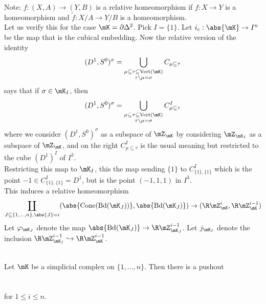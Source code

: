 \documentclass[a4paper]{article}
\begin{document}
Note: $f:(X,A)\to(Y,B)$ is a relative homeomorphism if $f:X\to Y$ is a homeomorphism and $\widetilde{f}:X/A\to Y/B$ is a homeomorphism. \\

Let us verify this for the case $\mK=\partial\Delta^2$. Pick $I=\{1\}$. Let $i_c:\abs{\mK}\to I^n$ be the map that is the cubical embedding. Now the relative version of the identity $$(D^1,S^0)^\sigma=\bigcup_{\substack{\mu\subseteq\tau\subseteq\text{Vert}(\mK)\\\tau\setminus\mu=\sigma}}C_{\mu\subseteq\tau}$$ says that if $\sigma\in\mK_I$, then $$(D^1,S^0)^\sigma=\bigcup_{\substack{\mu\subseteq\tau\subseteq\text{Vert}(\mK)\\\tau\setminus\mu=\sigma}}C_{\mu\subseteq\tau}^I$$ where we consider $(D^1,S^0)^\sigma$ as a subspace of $\mZ_\mK$ by considering $\mZ_{\mK_I}$ as a subspace of $\mZ_\mK$, and on the right $C_{\mu\subseteq\tau}^I$ is the usual meaning but restricted to the cube $(D^1)^I$ of $I^3$. \\

Restricting this map to $\mK_I$, this the map sending $\{1\}$ to $C_{\{1\},\{1\}}^I$ which is the point $-1\in C_{\{1\},\{1\}}^I=D^1$, but is the point $(-1,1,1)$ in $I^3$. \\

This induces a relative homeomorphism $$\coprod_{J\subseteq\{1,\dots,n\},\abs{J}=i}(\abs{\text{Cone}(\text{Bd}(\mK_J))},\abs{\text{Bd}(\mK_J)})\to(\R\mZ_\mK^i,\R\mZ_\mK^{i-1})$$ Let $\varphi_{\mK_J}$ denote the map $\abs{\text{Bd}(\mK_J)}\to\R\mZ_{\mK_J}^{i-1}$. Let $j_{\mK_I}$ denote the inclusion $\R\mZ_{\mK_I}^{i-1}\hookrightarrow\R\mZ_\mK^{i-1}$. 

\begin{prp}{}{}\\
Let $\mK$ be a simplicial complex on $\{1,\dots,n\}$. Then there is a pushout \\
 \\~\\
for $1\leq i\leq n$. 
\end{prp}
\end{document}
